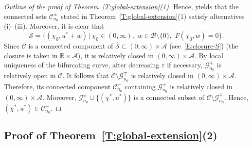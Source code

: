 \documentclass[11pt]{article} %
\theoremstyle{remark}
\theoremstyle{remark}
\numberwithin{equation}{section}
\numberwithin{figure}{section}
\numberwithin{table}{section}
\begin{document}
\begin{proof}[Outline of the proof of Theorem~\ref{T:global-extension}(1)]
  Hence, \cite[Theorem~4.4]{shi.wang:09:on} yields  that the connected sets
  $\mathcal{C}_{n_0}^{\pm}$ stated in Theorem~\ref{T:global-extension}(1)
  satisfy alternatives (i)--(iii). Moreover, it is clear that
  \[
    \mathcal{S}=
    \{(\chi_0, u^*+w)\,|\, \chi_0\in (0,\infty), \,\,
    w\in\mathcal{B}\setminus\{0\},\,\, F(\chi_0,w)=0\}.
  \]
  Since $\mathcal{C}$ is a connected component of $\overline{\mathcal{S}}
  \subset (0, \infty)\times {\mathcal{A}}$ (see~\eqref{E:closure-S}) (the
  closure is taken in $\mathbb{R}\times\mathcal{A}$), it is relatively closed in
  $(0, \infty)\times
  \mathcal{A}$. By local uniqueness of the bifurcating curve, after decreasing
  $\varepsilon$ if necessary, $\mathcal{G}_{n_0}^{\mp}$ is relatively open in
  $\mathcal{C}$. It follows that $\mathcal{C}\setminus\mathcal{G}_{n_0}^{\mp}$
  is relatively closed in $(0, \infty)\times\mathcal{A}$. Therefore, its
  connected component $\mathcal{C}_{n_0}^{\pm}$ containing
  $\mathcal{G}_{n_0}^{\pm}$ is relatively closed in $(0,
  \infty)\times\mathcal{A}$. Moreover,
  $\mathcal{G}_{n_0}^{\pm}\cup\{(\chi^*,u^*)\}$ is a connected subset of
  $\mathcal{C}\setminus\mathcal{G}_{n_0}^{\mp}$. Hence, $(\chi^*,u^*) \in
  \mathcal{C}_{n_0}^{\pm}$.
\end{proof}


\subsection{Proof of Theorem~\ref{T:global-extension}(2)}
\end{document}
